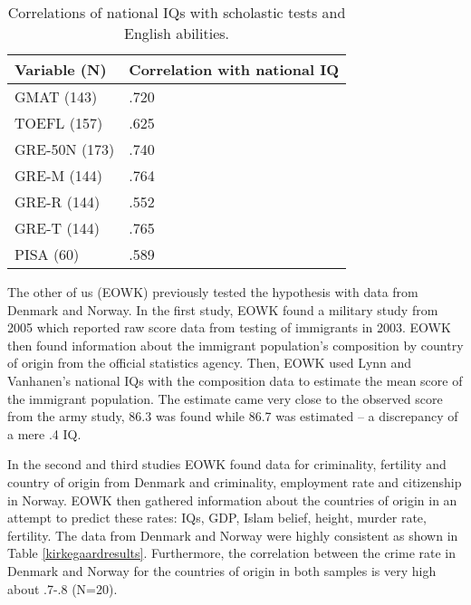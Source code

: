 \documentclass[a4paper,12pt]{article}
\begin{document}
\begin{table}[H]
\centering
\begin{tabular}{|l|l|}
\hline
\textbf{Variable (N)}    & \textbf{Correlation with national IQ} \\ \hline
GMAT (143)               & .720                                  \\ \hline
TOEFL (157)              & .625                                  \\ \hline
GRE-50N (173)            & .740                                  \\ \hline
GRE-M (144)              & .764                                  \\ \hline
GRE-R (144)              & .552                                  \\ \hline
GRE-T (144)              & .765                                  \\ \hline
PISA (60)		 & .589                                  \\ \hline
\end{tabular}
\caption{Correlations of national IQs with scholastic tests and English abilities.}\label{JFresults}
\end{table}

The other of us (EOWK) previously tested the hypothesis with data from Denmark and Norway\cite{kirkegaard2013DK,kirkegaard2014DK,kirkegaard2014NO}. In the first study, EOWK found a military study from 2005 which reported raw score data from testing of immigrants in 2003. EOWK then found information about the immigrant population's composition by country of origin from the official statistics agency. Then, EOWK used Lynn and Vanhanen's national IQs with the composition data to estimate the mean score of the immigrant population. The estimate came very close to the observed score from the army study, 86.3 was found while 86.7 was estimated -- a discrepancy of a mere .4 IQ.

In the second and third studies EOWK found data for criminality, fertility and country of origin from Denmark and criminality, employment rate and citizenship in Norway. EOWK then gathered information about the countries of origin in an attempt to predict these rates: IQs, GDP, Islam belief, height, murder rate, fertility. The data from Denmark and Norway were highly consistent as shown in Table \ref{kirkegaardresults}. Furthermore, the correlation between the crime rate in Denmark and Norway for the countries of origin in both samples is very high about .7-.8 (N=20).
\end{document}
